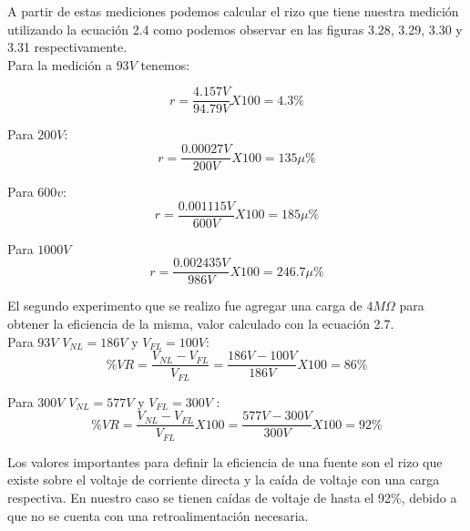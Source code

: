A partir de estas mediciones podemos calcular el rizo que tiene nuestra medición utilizando la ecuación 2.4 como podemos observar en las figuras 3.28, 3.29, 3.30 y 3.31  respectivamente. \\

Para la medición a $93V$ tenemos:

 $$r=\frac{4.157V}{94.79V}X100=4.3 \% $$ 
 
 Para $200V$: $$r=\frac{0.00027V}{200V}X100=135\mu \% $$ 
 
 Para $600v:$  $$r=\frac{0.001115V}{600V}X100=185\mu \% $$ 
 
 Para $1000V$  $$r=\frac{0.002435V}{986V}X100=246.7\mu \% $$

El segundo experimento que se realizo fue agregar una carga de $4M\Omega$ para obtener la eficiencia de la misma, valor calculado con la ecuación 2.7. \\

Para $93V$ $V_{NL}=186V$ y $V_{FL}=100V$: $$\%VR=\frac{V_{NL}-V_{FL}}{V_{FL}}=\frac{186V-100V}{186V}X100= 86 \% $$

Para $300V$ $V_{NL}=577V$ y $V_{FL}=300V$ : $$\%VR=\frac{V_{NL}-V_{FL}}{V_{FL}}X100=\frac{577V-300V}{300V}X100= 92\% $$

Los valores importantes para definir la eficiencia de una fuente son el rizo que existe sobre el voltaje de corriente directa y la caída de voltaje con una carga respectiva. En nuestro caso se tienen caídas de voltaje de hasta el 92\%, debido a que no se cuenta con una retroalimentación necesaria. 
